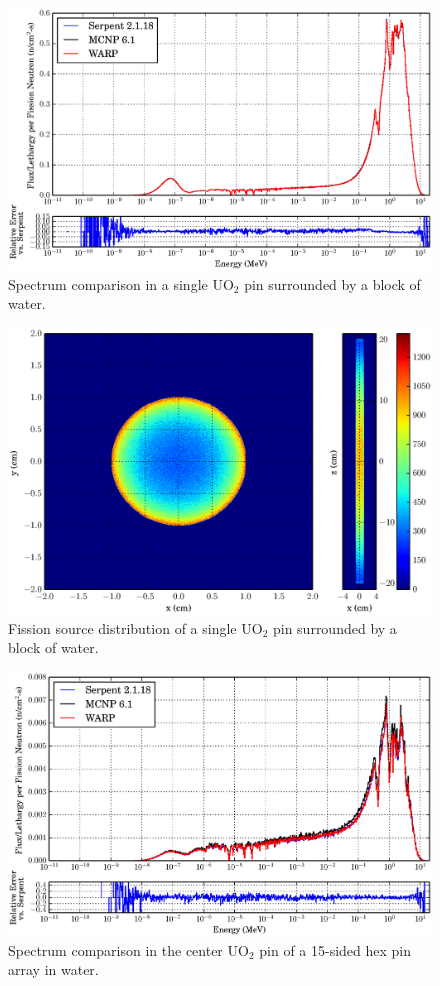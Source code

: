 \begin{figure}[h!] 
\centering
\includegraphics[width=\textwidth]{graphics/finalresults/pincell_spec-6.eps}
\caption{Spectrum comparison in a single UO$_2$ pin surrounded by a block of water. \label{pincell_spec} }
\end{figure}

\begin{figure}[h!]
\centering
\includegraphics[width=.8\textwidth]{graphics/finalresults/pincell_fiss-6.eps}
\caption{Fission source distribution of a single UO$_2$ pin surrounded by a block of water. \label{pincell_fiss} }
\end{figure}

\begin{figure}[h!] 
\centering
\includegraphics[width=\textwidth]{graphics/finalresults/assembly_spec-6.eps}
\caption{Spectrum comparison in the center UO$_2$ pin of a 15-sided hex pin array in water. \label{assembly_spec} }
\end{figure}

